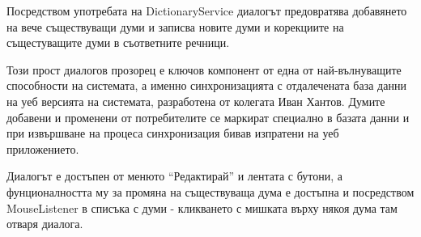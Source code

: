 \begin{itemize}
     Посредством употребата на DictionaryService диалогът предовратява
     добавянето на вече съществуващи думи и записва новите думи и
     корекциите на същестуващите думи в съответните речници.

     Този прост диалогов прозорец е ключов компонент от една от
     най-вълнуващите способности на системата, а именно
     синхронизацията с отдалечената база данни на уеб версията на
     системата, разработена от колегата Иван Хантов. Думите добавени и
     променени от потребителите се маркират специално в базата данни и
     при извършване на процеса синхронизация бивав изпратени на уеб
     приложението. 

     Диалогът е достъпен от менюто "`Редактирай"' и лентата с бутони,
     а фунционалността му за промяна на съществуваща дума е достъпна и
     посредством MouseListener в списъка с думи - кликването с мишката
     върху някоя дума там отваря диалога.
\end{itemize}


